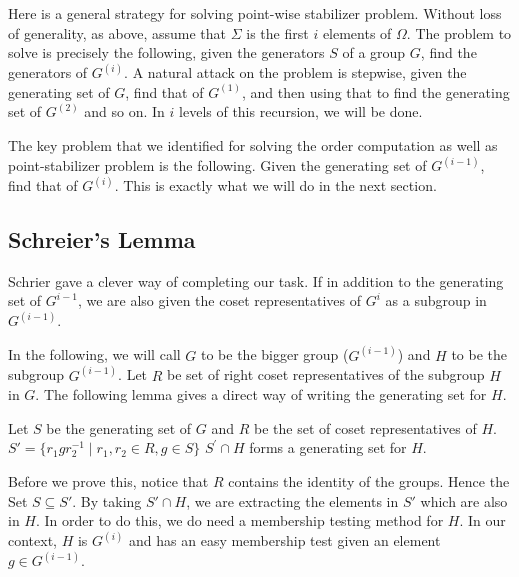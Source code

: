Here is a general strategy for solving point-wise stabilizer problem. Without loss of generality, as above, assume that $\Sigma$ is the first $i$ elements of $\Omega$. The problem to solve is precisely the following, given the generators $S$ of a group $G$, find the generators of $G^{(i)}$. A natural attack on the problem is stepwise, given the generating set of $G$, find that of $G^{(1)}$, and then using that to find the generating set of $G^{(2)}$ and so on. In $i$ levels of this recursion, we will be done.

The key problem that we identified for solving the order computation as well as point-stabilizer problem is the following. Given the generating set of $G^{(i-1)}$, find that of $G^{(i)}$. This is exactly what we will do in the next section.

\subsection{Schreier's Lemma}

Schrier gave a clever way of completing our task. If in addition to the generating set of $G^{i-1}$, we are also given the coset representatives of $G^{i}$ as a subgroup in $G^{(i-1)}$.

In the following, we will call $G$ to be the bigger group ($G^{(i-1)}$) and $H$ to be the subgroup $G^{(i-1)}$. Let $R$ be set of right coset representatives of the subgroup $H$ in $G$. 
The following lemma gives a direct way of writing the generating set for $H$. 

\begin{lemma}
Let $S$ be the generating set of $G$ and $R$ be 
the set of coset representatives of $H$.
$S' = \lbrace r_1 g r_2^{-1} \mid r_1, r_2 \in R, g \in S \rbrace$ 
$S^\prime \cap H$ forms a generating set for $H$.
\end{lemma}
Before we prove this, notice that $R$ contains the identity of the groups. Hence the Set $S \subseteq S'$. By taking $S' \cap H$, we are extracting the elements in $S'$ which are also in $H$. In order to do this, we do need a membership testing method for $H$. In our context, $H$ is $G^{(i)}$ and has an easy membership test given an element $g \in G^{(i-1)}$.


